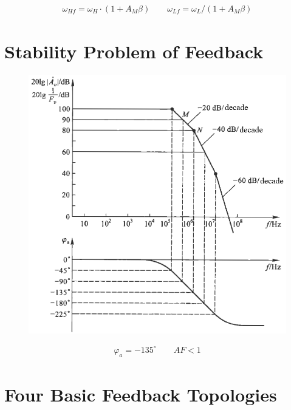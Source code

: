 \begin{equation*}
  \begin{aligned}
    \omega_{Hf} = \omega_H \cdot \left( 1 + A_M \beta \right) \quad\quad \omega_{Lf} = \omega_L / \left( 1 + A_M \beta \right)
  \end{aligned}
\end{equation*}

\section{Stability Problem of Feedback}

\begin{figure}[H]
  \centering
  \includegraphics[width=0.8\linewidth]{figures/Stability-Feedback}
\end{figure}

\begin{equation*}
  \begin{aligned}
    \varphi_{a} = -135^{\circ} \quad\quad AF < 1
  \end{aligned}
\end{equation*}

\section{Four Basic Feedback Topologies}

